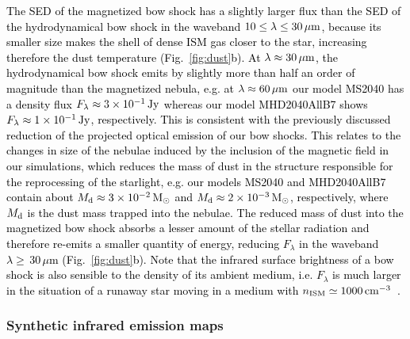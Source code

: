 \documentclass[useAMS,usenatbib]{mn2e}
\begin{document}
\textcolor{black}{
The SED of the magnetized bow shock has a slightly larger flux than the 
SED of the hydrodynamical bow shock in the waveband $10\le \lambda 
\le 30\, \mu \rm m$, because its smaller size makes the shell of dense ISM 
gas closer to the star, increasing therefore the dust temperature (Fig.~\ref{fig:dust}b). 
At $\lambda \approx 30\, \mu \rm m$, the hydrodynamical bow shock emits by slightly 
more than half an order of magnitude than the magnetized nebula, 
e.g. at $\lambda \approx 60\, \mu \rm m$ our model MS2040 has a density flux 
$F_{\lambda} \approx 3\times 10^{-1}\, \rm Jy$ whereas our model MHD2040AllB7 shows  
$F_{\lambda} \approx 1\times 10^{-1}\, \rm Jy$, respectively. This is consistent 
with the previously discussed reduction of the projected optical emission of 
our bow shocks. This relates to the changes in size of the nebulae induced by 
the inclusion of the magnetic field in our simulations, which reduces the mass of dust in 
the structure responsible for the reprocessing of the starlight, e.g. 
our models MS2040 and MHD2040AllB7 contain about 
$M_{\rm d}\approx3\times 10^{-2}\, \rm M_{\odot}$ and 
$M_{\rm d}\approx2\times 10^{-3}\, \rm M_{\odot}$, respectively, where 
$M_{\rm d}$ is the dust mass trapped into the nebulae. The reduced mass    
of dust into the magnetized bow shock absorbs a lesser amount of the stellar 
radiation and therefore re-emits a smaller quantity of energy,  
reducing $F_{\lambda}$ in the waveband $\lambda\ge\, 30\, \mu$m 
(Fig.~\ref{fig:dust}b). 
Note that the infrared 
surface brightness of a bow shock is also sensible to the density of its ambient 
medium, i.e. $F_{\lambda}$ is much larger in the situation of a runaway star moving 
in a medium with $n_{\rm ISM}\simeq 1000\, \rm cm^{-3}$~\citep{acreman_mnras_456_2016}.  
%
}


\subsubsection{Synthetic infrared emission maps}
\label{sect:infrared_maps}
\end{document}
